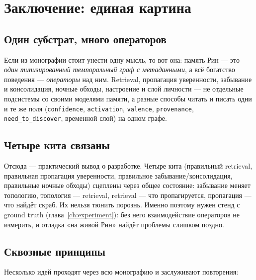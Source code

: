 \chapter{Заключение: единая картина}
\label{ch:conclusion}

\section{Один субстрат, много операторов}

Если из монографии стоит унести одну мысль, то вот она: память Рин — это
\emph{один типизированный темпоральный граф с метаданными}, а всё богатство
поведения — \emph{операторы} над ним. Retrieval, пропагация уверенности,
забывание и консолидация, ночные обходы, настроение и слой личности — не отдельные
подсистемы со своими моделями памяти, а разные способы читать и писать одни и те
же поля (\texttt{confidence}, \texttt{activation}, \texttt{valence},
\texttt{provenance}, \texttt{need\_to\_discover}, временной слой) на одном графе.

\section{Четыре кита связаны}

Отсюда — практический вывод о разработке. Четыре кита (правильный retrieval,
правильная пропагация уверенности, правильное забывание/консолидация, правильные
ночные обходы) сцеплены через общее состояние: забывание меняет топологию,
топология — retrieval, retrieval — что пропагируется, пропагация — что найдёт скраб.
Их нельзя тюнить порознь. Именно поэтому нужен стенд с ground truth
(глава~\ref{ch:experiment}): без него взаимодействие операторов не измерить, и
отладка «на живой Рин» найдёт проблемы слишком поздно.

\section{Сквозные принципы}

Несколько идей проходят через всю монографию и заслуживают повторения:

